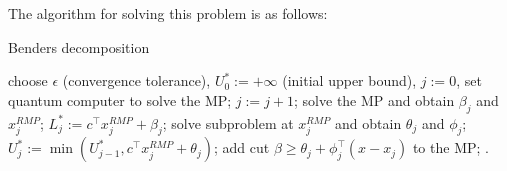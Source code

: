 \documentclass[a4paper,12pt]{article}
\begin{document}
The algorithm for solving this problem is as follows: 

\begin{algorithm}[H]
\caption{Benders decomposition}
\begin{algorithmic}[1]
\State choose $\epsilon$ (convergence tolerance), $U_0^* := +\infty$ (initial upper bound), $j := 0$, set quantum computer to solve the MP;
\Repeat
    \State $j := j + 1$;
    \State solve the MP and obtain $\beta_j$ and $x_j^{RMP}$; $L_j^* := c^\top x_j^{RMP} + \beta_j$;
    \State solve subproblem at $x_j^{RMP}$ and obtain $\theta_j$ and $\phi_j$;
    \State $U_j^* := \min (U_{j-1}^*, c^\top x_j^{RMP} + \theta_j)$;
    \State add cut $\beta \geq \theta_j + \phi_j^\top (x - x_j)$ to the MP;
.
\end{algorithmic}
\end{algorithm}
\end{document}
